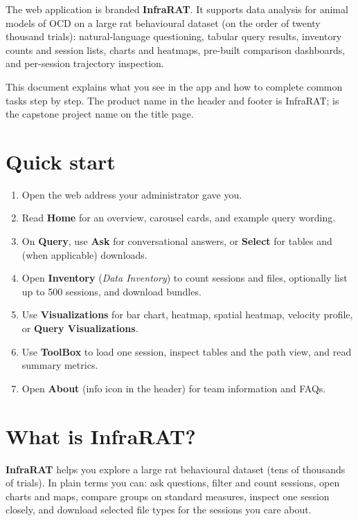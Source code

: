 \documentclass{article}
\begin{document}
The web application is branded \textbf{InfraRAT}. It supports data analysis for animal models of OCD on a large rat behavioural dataset (on the order of twenty thousand trials): natural-language questioning, tabular query results, inventory counts and session lists, charts and heatmaps, pre-built comparison dashboards, and per-session trajectory inspection.

This document explains what you see in the app and how to complete common tasks step by step. The product name in the header and footer is InfraRAT; \progname{} is the capstone project name on the title page.

\section{Quick start}
\label{sec:quick-start}

\begin{enumerate}[nosep]
  \item Open the web address your administrator gave you.
  \item Read \textbf{Home} for an overview, carousel cards, and example query wording.
  \item On \textbf{Query}, use \textbf{Ask} for conversational answers, or \textbf{Select} for tables and (when applicable) downloads.
  \item Open \textbf{Inventory} (\emph{Data Inventory}) to count sessions and files, optionally list up to 500 sessions, and download bundles.
  \item Use \textbf{Visualizations} for bar chart, heatmap, spatial heatmap, velocity profile, or \textbf{Query Visualizations}.
  \item Use \textbf{ToolBox} to load one session, inspect tables and the path view, and read summary metrics.
  \item Open \textbf{About} (info icon in the header) for team information and FAQs.
\end{enumerate}

\section{What is InfraRAT?}
\label{sec:what}

\textbf{InfraRAT} helps you explore a large rat behavioural dataset (tens of thousands of trials). In plain terms you can: ask questions, filter and count sessions, open charts and maps, compare groups on standard measures, inspect one session closely, and download selected file types for the sessions you care about.
\end{document}
